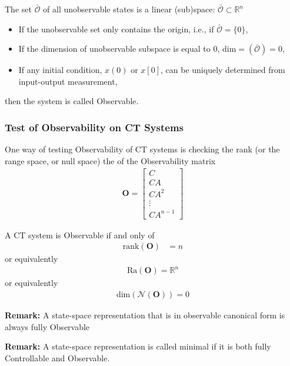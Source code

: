 \documentclass[twoside]{article}
\begin{document}
  The set $\bar{\mathcal{O}}$ of all unobservable states is a linear
  (sub)space: $\bar{\mathcal{O}} \subset \mathbb{R}^n$

\begin{itemize}
%
 \item If the unobservable set only contains the origin, 
   i.e., if $\bar{\mathcal{O}} = \lbrace 0 \rbrace$, 
%
 \item If the dimension of unobservable subspace is equal to 0,
   $\mathrm{dim} = \left( \bar{\mathcal{O}} \right) = 0$,
 \item If any initial condition, $x(0)$ or $x[0]$, can be uniquely 
 determined from input-output measurement,
%
\end{itemize} 
then the system is called Observable. 

\subsubsection{Test of Observability on CT Systems}

One way of testing Observability of CT systems is checking the rank
(or the range space, or null space) the of the Observability matrix
%
\begin{align*}
  \mathbf{O} =
\left[ \begin{array}{c}
C 
\\
C A
\\
C A^2 
\\
  \vdots
\\
C A^{n-1}
\end{array}
\right] 
\end{align*} 
%

A CT system is Observable if and only of
%
\begin{align*}
  \mathrm{rank} ( \mathbf{O} ) &= n
\end{align*} 
%
or equivalently 
%
\begin{align*}
 \mathrm{Ra} ( \mathbf{O} ) = \mathbb{R}^n
\end{align*} 
%
or equivalently 
%
\begin{align*}
 \mathrm{dim} \left ( \mathcal{N} ( \mathbf{O} ) \right) = 0
\end{align*} 

\vspace{6pt}

\textbf{Remark:} A state-space representation that is
in observable canonical form is always fully Observable

\vspace{6pt}

\textbf{Remark:} A state-space representation is called minimal 
if it is both fully Controllable and Observable. 

\end{document}
